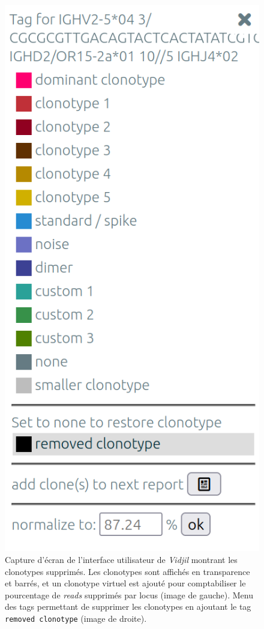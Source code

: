 \begin{figure}[H]
\begin{minipage}{0.3\textwidth}
        \includegraphics[width=01\textwidth]{images/tag_menu.png}
    \end{minipage}
    \caption{
        Capture d'écran de l'interface utilisateur de \textit{Vidjil} montrant les clonotypes supprimés. 
        Les clonotypes sont affichés en transparence et barrés, et un clonotype virtuel est ajouté pour 
        comptabiliser le pourcentage de \textit{reads} supprimés par locus (image de gauche).
        Menu des tags permettant de supprimer les clonotypes en ajoutant le tag \texttt{removed clonotype} 
        (image de droite).
    }
    \label{fig:removed-clonotypes}
\end{figure}

